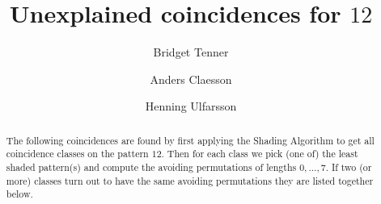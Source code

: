 \documentclass[12pt,reqno]{amsart}
\theoremstyle{plain}
\theoremstyle{definition}
\numberwithin{equation}{section}
\begin{document}
\title{Unexplained coincidences for $12$}

\author[Tenner]{Bridget Tenner}
\author[Claesson]{Anders Claesson}
\author[Ulfarsson]{Henning Ulfarsson}

\address[Tenner]{School of Computer Science, Reykjav\'ik University, Menntavegi 1, 101 Reykjav\'ik, \mbox{Iceland}}
\address[Claesson]{Department of Computer and Information Sciences, University of Strathclyde, Glasgow G1 1XH, UK}
\address[Ulfarsson]{School of Computer Science, Reykjav\'ik University, Menntavegi 1, 101 Reykjav\'ik, Iceland}



\begin{abstract}
The following coincidences are found by first applying the Shading Algorithm to
get all coincidence classes on the pattern $12$. Then for each class we pick (one of) the least shaded pattern(s)
and compute the avoiding permutations of lengths $0, \dots, 7$. If two (or more) classes turn out to have the same avoiding permutations they
are listed together below.
\end{abstract}



\maketitle
\end{document}
